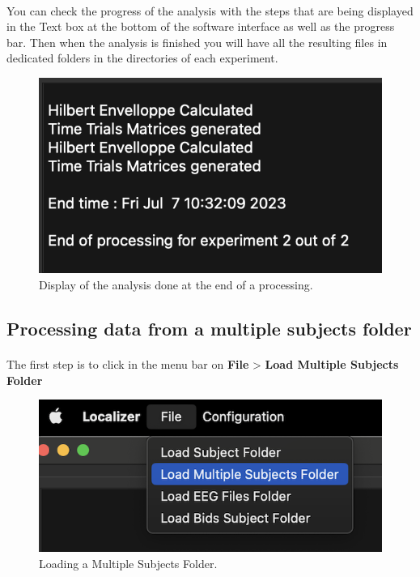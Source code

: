\documentclass[a4paper]{article}
\begin{document}
\paragraph{} You can check the progress of the analysis with the steps that are being displayed in the Text box at the bottom of the software interface as well as the progress bar. Then when the analysis is finished you will have all the resulting files in dedicated folders in the directories of each experiment.

\begin{figure}[H]
\begin{center}
\includegraphics[scale=0.6]{EndOfAnalysis.png}
\end{center}
\caption{\label{EndOfAnalysis}Display of the analysis done at the end of a processing.}
\end{figure}

\subsection{Processing data from a multiple subjects folder}
\paragraph{} The first step is to click in the menu bar on \textbf{File} > \textbf{Load Multiple Subjects Folder}
\begin{figure}[H]
\begin{center}
\includegraphics[scale=0.6]{SelectLoadMultipleSubjectsFolder.png}
\end{center}
\caption{\label{LoadMultiSubjectFolder}Loading a Multiple Subjects Folder.}
\end{figure}
\end{document}
